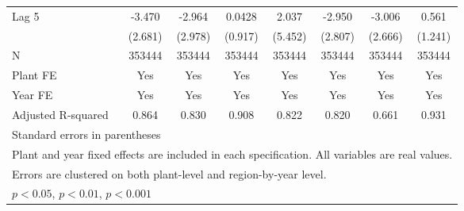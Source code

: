 \begin{table}[htbp]
\begin{tabular}{l*{7}{c}}
\addlinespace
Lag 5           &   -3.470         &   -2.964         &   0.0428         &    2.037         &   -2.950         &   -3.006         &    0.561         \\
                &  (2.681)         &  (2.978)         &  (0.917)         &  (5.452)         &  (2.807)         &  (2.666)         &  (1.241)         \\
\midrule
N               &   353444         &   353444         &   353444         &   353444         &   353444         &   353444         &   353444         \\
Plant FE        &      Yes         &      Yes         &      Yes         &      Yes         &      Yes         &      Yes         &      Yes         \\
Year FE         &      Yes         &      Yes         &      Yes         &      Yes         &      Yes         &      Yes         &      Yes         \\
Adjusted R-squared&    0.864         &    0.830         &    0.908         &    0.822         &    0.820         &    0.661         &    0.931         \\
\bottomrule
\multicolumn{8}{l}{\footnotesize Standard errors in parentheses}\\
\multicolumn{8}{l}{\footnotesize Plant and year fixed effects are included in each specification. All variables are real values.}\\
\multicolumn{8}{l}{\footnotesize Errors are clustered on both plant-level and region-by-year level.}\\
\multicolumn{8}{l}{\footnotesize \sym{*} \(p<0.05\), \sym{**} \(p<0.01\), \sym{***} \(p<0.001\)}\\
\end{tabular}
\end{table}
